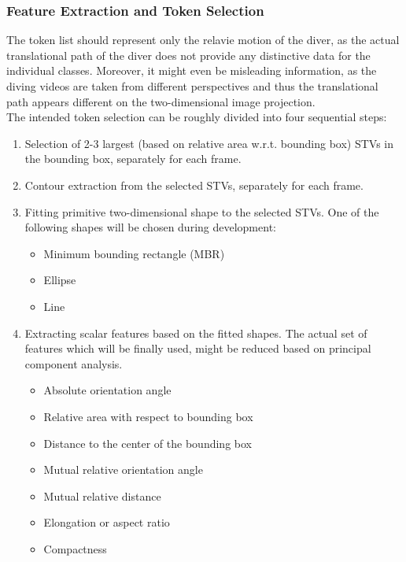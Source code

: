 \documentclass[10pt]{article}
\begin{document}
\subsubsection{Feature Extraction and Token Selection}
The token list should represent only the relavie motion of the diver, as the actual translational path of the diver does not provide any distinctive data for the individual classes. Moreover, it might even be misleading information, as the diving videos are taken from different perspectives and thus the translational path appears different on the two-dimensional image projection.\\
The intended token selection can be roughly divided into four sequential steps:
\begin{enumerate}
\item Selection of 2-3 largest (based on relative area w.r.t. bounding box) STVs in the bounding box, separately for each frame.
\item Contour extraction from the selected STVs, separately for each frame.
\item Fitting primitive two-dimensional shape to the selected STVs. One of the following shapes will be chosen during development:
  \begin{itemize}
  \item Minimum bounding rectangle (MBR)
  \item Ellipse
  \item Line
  \end{itemize}
\item Extracting scalar features based on the fitted shapes. The actual set of features which will be finally used, might be reduced based on principal component analysis.
  \begin{itemize}
  \item Absolute orientation angle
  \item Relative area with respect to bounding box
  \item Distance to the center of the bounding box
  \item Mutual relative orientation angle
  \item Mutual relative distance
  \item Elongation or aspect ratio
  \item Compactness
  \end{itemize}
\end{enumerate}
\end{document}
